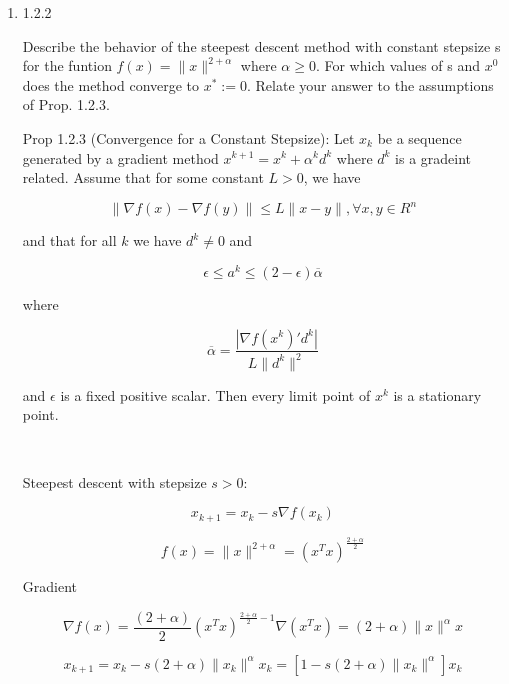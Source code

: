 \documentclass[11pt,letterpaper]{article}
\begin{document}
\begin{enumerate}
	\[ x_0 + \alpha d_0 = (1,-2) + (-1, 2/3)
	= (0, -4/3)\]

	\[ f(0, -4/3) = 256/81 \]   

	\[ f(x_0) + \sigma \alpha
	\nabla f(x_0)^T d_0 = 244/15 \]
	
	\[ f(x_0 + \alpha d_0) = 256/81
	\leq f(x_0) + \sigma \alpha
	\nabla f(x_0)^T d_0 = 244/15 \]

	This step is accepted. After one
	Newton iteration:

	\[ x_1 = (0, -4/3) \]

	Newton's method requires additional calculations
	for the hessian but converges more rapidly.

	\item 1.2.2

	Describe the behavior of the steepest descent method with
	constant stepsize s for the funtion
	$f(x) = \|x\|^{2 + \alpha}$ where $\alpha \geq 0$.
	For which values of s and $x^0$ does the method converge to
	$x^* := 0$.
	Relate your answer to the assumptions of Prop. 1.2.3.

	Prop 1.2.3 (Convergence for a Constant Stepsize):
	Let $x_k$ be a sequence generated by a gradient
	method $x^{k+1} = x^k + \alpha^k d^k$ where $d^k$
	is a gradeint related.
	Assume that for some constant $L > 0$, we have
	
	\[ \| \nabla f(x) - \nabla f(y) \| \leq L \|x-y\|, \forall x,y \in R^n \]
	
	and that for all $k$ we have $d^k \neq 0$ and

	\[ \epsilon \leq a^k \leq (2 - \epsilon) \overline{\alpha} \]

	where

	\[ \overline{\alpha} = \frac{| \nabla f(x^k)' d^k |}{L \| d^k \|^2} \]

	and $\epsilon$ is a fixed positive scalar.
	Then every limit point of $x^k$ is a 
	stationary point.

	\ 

	Steepest descent with stepsize $s>0$:

	\[ x_{k+1} = x_k - s \nabla f(x_k) \]

	\[ f(x) = 
	\|x\|^{2 + \alpha} = (x^T x)^{\frac{2 + \alpha}{2}} \]

	Gradient

	\[ \nabla f(x) = 
	\frac{(2 + \alpha)}{2} 
	(x^Tx)^{\frac{2 + \alpha}{2} - 1} 
	\nabla (x^T x) =
	(2 + \alpha) \|x\|^{\alpha} x
	\]

	\[ x_{k+1} = 
	x_k - s(2 + \alpha) \|x_k\|^{\alpha} x_k =
	[1 - s(2 + \alpha) \|x_k\|^{\alpha}]x_k
	\]


\end{enumerate}
\end{document}
